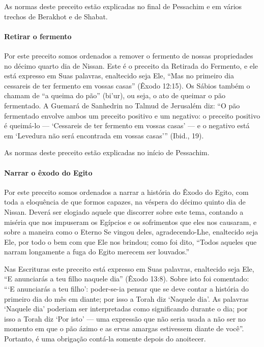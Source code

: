 As normas deste preceito estão explicadas no final de Pessachim e em
vários trechos de Berakhot e de Shabat.

\paragraph{Retirar o fermento}

Por este preceito somos ordenados a remover o fermento de nossas
propriedades no décimo quarto dia de Nissan. Este é o preceito da
Retirada do Fermento, e ele está expresso em Suas palavras, enaltecido seja Ele,
``Mas no primeiro dia cessareis de ter fermento em vossas casas'' (Êxodo 12:15).
Os Sábios também o chamam de ``a queima do pão'' (bi'ur), ou seja, o ato
de queimar o pão fermentado. A Guemará de Sanhedrin no Talmud de
Jerusalém diz: ``O pão fermentado envolve ambos um preceito positivo e um negativo: o
preceito positivo é queimá-lo --- `Cessareis de ter fermento em vossas
casas' --- e o negativo está em `Levedura não será encontrada em vossas casas'''
(Ibid., 19).

As normas deste preceito estão explicadas no início de Pessachim.

\paragraph{Narrar o êxodo do Egito}

Por este preceito somos ordenados a narrar a história do Êxodo do Egito,
com toda a eloquência de que formos capazes, na véspera do décimo quinto
dia de Nissan. Deverá ser elogiado aquele que discorrer sobre este tema,
contando a miséria que nos impuseram os Egípcios e os sofrimentos que
eles nos causaram, e sobre a maneira como o Eterno Se vingou deles,
agradecendo-Lhe, enaltecido seja Ele, por todo o bem com que Ele nos
brindou; como foi dito, ``Todos aqueles que narram longamente a fuga do
Egito merecem ser louvados.''

Nas Escrituras este preceito está expresso em Suas palavras, enaltecido
seja Ele, ``E anunciarás a teu filho naquele dia'' (Êxodo 13:8). Sobre
isto foi comentado: ```E anunciarás a teu filho': poder-se-ia pensar que
se deve contar a história do primeiro dia do mês em diante; por isso a
Torah diz `Naquele dia'. As palavras `Naquele dia' poderiam ser
interpretadas como significando durante o dia; por isso a Torah diz
`Por isto' --- uma expressão que não seria usada a não ser no momento em
que o pão ázimo e as ervas amargas estivessem diante de você''.
Portanto, é uma obrigação contá-la somente depois do anoitecer.

